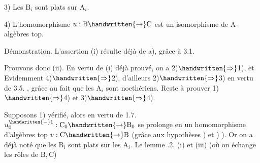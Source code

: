 3) Les $\mathrm B_i$ sont plats sur $\mathrm A_i$.

4) L'homomorphisme $u:\mathrm B\handwritten{\to}\mathrm C$ est un isomorphisme\deleted{\unsure{,}} de $\mathrm A$-algèbres top.


Démonstration. L'assertion (i) résulte déjà de a), grâce à 3.1.

Prouvons donc (ii). En vertu de (i) déjà prouvé, on a 2)$\handwritten{\Rightarrow}$1), et Evidemment 4)$\handwritten{\Rightarrow}$2), d'ailleurs 2)$\handwritten{\Rightarrow}$3) en vertu de 3.5. , grâce au fait que les $\mathrm A_i$ sont noethériens. Reste à prouver 1)$\handwritten{\Rightarrow}$4) et 3)$\handwritten{\Rightarrow}$4).

Supposons 1) vérifié, alors en vertu de 1.7. $u_0^{\handwritten{-}1}:\mathrm C_0\handwritten{\to}\mathrm B_0$ se prolonge en un homomorphisme d'algèbres top $v:\mathrm C\handwritten{\to}\mathrm B$ (grâce aux hypothèses ) et ) ). Or on a déjà noté que les $\mathrm B_i$ sont plats sur les $\mathrm A_i$. Le lemme .2. (i) et (iii) (où on échange les rôles de $\mathrm B,\mathrm C$)
